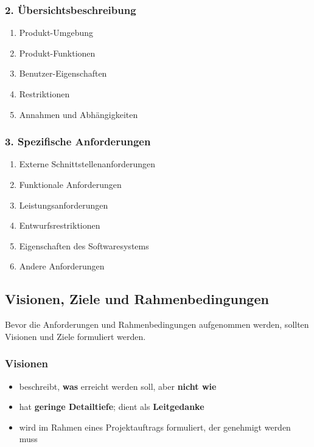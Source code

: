 \documentclass[11pt, a4paper]{article}
\begin{document}
\subsubsection*{2. Übersichtsbeschreibung}

\begin{enumerate}[label=(\alph*)]
    \item Produkt-Umgebung
    \item Produkt-Funktionen
    \item Benutzer-Eigenschaften
    \item Restriktionen
    \item Annahmen und Abhängigkeiten
\end{enumerate}

\subsubsection*{3. Spezifische Anforderungen}

\begin{enumerate}[label=(\alph*)]
    \item Externe Schnittstellenanforderungen
    \item Funktionale Anforderungen
    \item Leistungsanforderungen
    \item Entwurfsrestriktionen
    \item Eigenschaften des Softwaresystems
    \item Andere Anforderungen
\end{enumerate}

\subsection{Visionen, Ziele und Rahmenbedingungen}

Bevor die Anforderungen und Rahmenbedingungen aufgenommen werden, sollten Visionen und Ziele formuliert werden.

\subsubsection{Visionen}

\begin{itemize}
    \item beschreibt, \textbf{was} erreicht werden soll, aber \textbf{nicht wie}
    \item hat \textbf{geringe Detailtiefe}; dient als \textbf{Leitgedanke}
    \item wird im Rahmen eines Projektauftrags formuliert, der genehmigt werden muss
\end{itemize}
\end{document}
